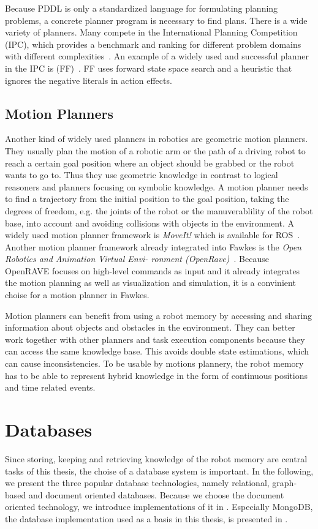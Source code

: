 Because PDDL is only a standardized language for formulating planning
problems, a concrete planner program is necessary to find plans. There
is a wide variety of planners. Many compete in the International
Planning Competition (IPC), which provides a benchmark and ranking for
different problem domains with different
complexities~\cite{planning-competition}. An example of a widely used
and successful planner in the IPC is (FF)~\cite{hoffmannFF}. FF uses
forward state space search and a heuristic that ignores the negative
literals in action effects.

\subsection{Motion Planners}
Another kind of widely used planners in robotics are geometric motion
planners. They usually plan the motion of a robotic arm or the path of
a driving robot to reach a certain goal position where an object
should be grabbed or the robot wants to go to. Thus they use geometric
knowledge in contrast to logical reasoners and planners focusing on
symbolic knowledge.  A motion planner needs to find a trajectory from
the initial position to the goal position, taking the degrees of
freedom, e.g. the joints of the robot or the manuverablility of the
robot base, into account and avoiding collisions with objects in the
environment. A widely used motion planner framework is \emph{MoveIt!}
which is available for ROS~\cite{MoveIt}. Another motion planner
framework already integrated into Fawkes is the \emph{Open Robotics
  and Animation Virtual Envi- ronment
  (OpenRave)}~\cite{OpenRave}. Because OpenRAVE focuses on high-level
commands as input and it already integrates the motion planning as
well as visualization and simulation, it is a convinient choise for a
motion planner in Fawkes.

Motion planners can benefit from using a robot memory by accessing and
sharing information about objects and obstacles in the environment.
They can better work together with other planners and task execution
components because they can access the same knowledge base. This
avoids double state estimations, which can cause inconsistencies. To
be usable by motions plannery, the robot memory has to be able to
represent hybrid knowledge in the form of continuous positions and
time related events.

\section{Databases}
\label{sec:databases}
Since storing, keeping and retrieving knowledge of the robot memory
are central tasks of this thesis, the choise of a database system is
important. In the following, we present the three popular database
technologies, namely relational, graph-based and document oriented
databases. Because we choose the document oriented technology, we
introduce implementations of it in
. Especially MongoDB, the database
implementation used as a basis in this thesis, is presented in
.

